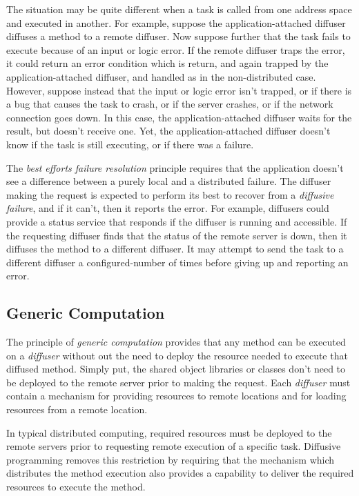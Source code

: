 \documentclass[11pt]{scrartcl}
\begin{document}
The situation may be quite different when a task is called from one address space and executed in another. For example, suppose the application-attached diffuser diffuses a method to a remote diffuser. Now suppose further that the task fails to execute because of an input or logic error. If the remote diffuser traps the error, it could return an error condition which is return, and again trapped by the application-attached diffuser, and handled as in the non-distributed case. However, suppose instead that the input or logic error isn't trapped, or if there is a bug that causes the task to crash, or if the server crashes, or if the network connection goes down. In this case, the application-attached diffuser waits for the result, but doesn't receive one. Yet, the application-attached diffuser doesn't know if the task is still executing, or if there was a failure.

The \emph{best efforts failure resolution} principle requires that the application doesn't see a difference between a purely local and a distributed failure. The diffuser making the request is expected to perform its best to recover from a \emph{diffusive failure}, and if it can't, then it reports the error. For example, diffusers could provide a status service that responds if the diffuser is running and accessible. If the requesting diffuser finds that the status of the remote server is down, then it diffuses the method to a different diffuser. It may attempt to send the task to a different diffuser a configured-number of times before giving up and reporting an error.

\subsection{Generic Computation\label{sec:generic_computation}}
The principle of \emph{generic computation} provides that any method can be executed on a \emph{diffuser} without out the need to deploy the resource needed to execute that diffused method. Simply put, the shared object libraries or classes don't need to be deployed to the remote server prior to making the request. Each \emph{diffuser} must contain a mechanism for providing resources to remote locations and for loading resources from a remote location.

In typical distributed computing, required resources must be deployed to the remote servers prior to requesting remote execution of a specific task. Diffusive programming removes this restriction by requiring that the mechanism which distributes the method execution also provides a capability to deliver the required resources to execute the method. 
\end{document}
